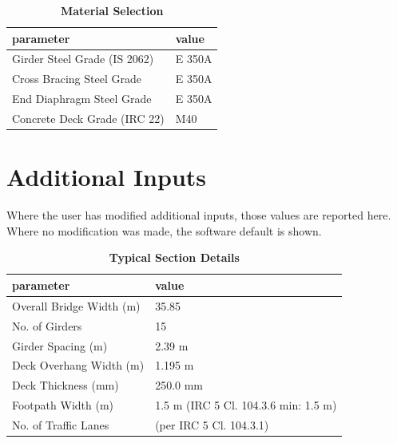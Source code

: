\documentclass[12pt,a4paper]{report}
\numberwithin{table}{chapter}
\numberwithin{figure}{chapter}
\begin{document}
\begin{table}[H]
\caption{\textbf{Material Selection}}
\label{subsec:material}
\begin{tabular}{|L{5.5cm}|L{8.5cm}|}
\hline
\textbf{parameter} & \textbf{value} \\
\hline
\textnormal{Girder Steel Grade (IS 2062)} & E 350A \\
\hline
\textnormal{Cross Bracing Steel Grade} & E 350A \\
\hline
\textnormal{End Diaphragm Steel Grade} & E 350A \\
\hline
\textnormal{Concrete Deck Grade (IRC 22)} & M40 \\
\hline
\end{tabular}
\end{table}
\vspace{0.4cm}

\newpage
\section{Additional Inputs}
\label{sec:additional-inputs}

Where the user has modified additional inputs, those values are reported here. Where no modification was made, the software default is shown.

\vspace{0.8cm}

\begin{longtable}{|L{5.5cm}|p{10.0cm}|}
\caption{\textbf{Typical Section Details}}
\hline
\textbf{parameter} & \textbf{value} \\
\hline
\textnormal{Overall Bridge Width (m)} & 35.85 \\[6pt]
\hline
\textnormal{No. of Girders} & 15 \\[6pt]
\hline
\textnormal{Girder Spacing (m)} & 2.39 m \\[6pt]
\hline
\textnormal{Deck Overhang Width (m)} & 1.195 m \\[6pt]
\hline
\textnormal{Deck Thickness (mm)} & 250.0 mm \\[6pt]
\hline
\textnormal{Footpath Width (m)} & 1.5 m (IRC 5 Cl. 104.3.6 min: 1.5 m) \\[6pt]
\hline
\textnormal{No. of Traffic Lanes} &  (per IRC 5 Cl. 104.3.1) \\[6pt]
\hline
\end{longtable}

\vspace{0.8em}
\end{document}
